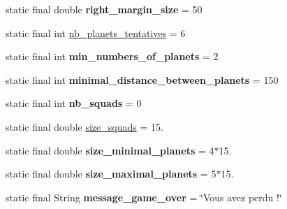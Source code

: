 \begin{DoxyCompactItemize}
\item 
\mbox{\label{classfr_1_1groupe40_1_1projet_1_1util_1_1_Constants_a88253d831700a561a099bccfe95fd11d}} 
static final double {\bfseries right\+\_\+margin\+\_\+size} = 50
\item 
static final int \mbox{\hyperlink{classfr_1_1groupe40_1_1projet_1_1util_1_1_Constants_a8e2d019fc2eedd9b61a3d82994e35d9f}{nb\+\_\+planets\+\_\+tentatives}} = 6
\item 
\mbox{\label{classfr_1_1groupe40_1_1projet_1_1util_1_1_Constants_a513ae64f34612eecfd202303918ae2fb}} 
static final int {\bfseries min\+\_\+numbers\+\_\+of\+\_\+planets} = 2
\item 
\mbox{\label{classfr_1_1groupe40_1_1projet_1_1util_1_1_Constants_a0cecc142100d00b8e40fb64575bd044f}} 
static final int {\bfseries minimal\+\_\+distance\+\_\+between\+\_\+planets} = 150
\item 
\mbox{\label{classfr_1_1groupe40_1_1projet_1_1util_1_1_Constants_a9b95b16149e38031c079a607a5d301ad}} 
static final int {\bfseries nb\+\_\+squads} = 0
\item 
static final double \mbox{\hyperlink{classfr_1_1groupe40_1_1projet_1_1util_1_1_Constants_a841b2f722e23d84cc2a49c2577d30e66}{size\+\_\+squads}} = 15.
\item 
\mbox{\label{classfr_1_1groupe40_1_1projet_1_1util_1_1_Constants_a04b2499b2e22521241aff510909bf2fa}} 
static final double {\bfseries size\+\_\+minimal\+\_\+planets} = 4$\ast$15.
\item 
\mbox{\label{classfr_1_1groupe40_1_1projet_1_1util_1_1_Constants_a4a5ef9ca60ae7c8668bfddbb6d1853b3}} 
static final double {\bfseries size\+\_\+maximal\+\_\+planets} = 5$\ast$15.
\item 
\mbox{\label{classfr_1_1groupe40_1_1projet_1_1util_1_1_Constants_a2d9a2b3fc75edb737987063ab014c22e}} 
static final String {\bfseries message\+\_\+game\+\_\+over} = \char`\"{}Vous avez perdu !\char`\"{}

\end{DoxyCompactItemize}
